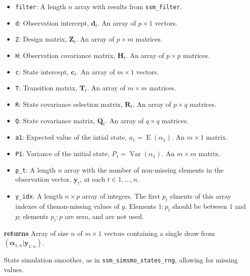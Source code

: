 \documentclass[]{book}
\providecommand{\tightlist}{%
  \setlength{\itemsep}{0pt}\setlength{\parskip}{0pt}}
\DeclareMathOperator{\E}{E}
\DeclareMathOperator{\Var}{Var}
\newcommand{\mat}[1]{\boldsymbol{#1}}
\renewcommand{\vec}[1]{\boldsymbol{#1}}
\begin{document}
\begin{itemize}
\tightlist
\item
  \texttt{filter}: A length \(n\) array with results from
  \texttt{ssm\_filter}.
\item
  \texttt{d}: Observation intercept, \(\vec{d}_t\). An array of
  \(p \times 1\) vectors.
\item
  \texttt{Z}: Design matrix, \(\mat{Z}_t\). An array of \(p \times m\)
  matrices.
\item
  \texttt{H}: Observation covariance matrix, \(\mat{H}_t\). An array of
  \(p \times p\) matrices.
\item
  \texttt{c}: State intercept, \(\vec{c}_t\). An array of \(m \times 1\)
  vectors.
\item
  \texttt{T}: Transition matrix, \(\mat{T}_t\). An array of
  \(m \times m\) matrices.
\item
  \texttt{R}: State covariance selection matrix, \(\mat{R} _t\). An
  array of \(p \times q\) matrices.
\item
  \texttt{Q}: State covariance matrix, \(\mat{Q}_t\). An array of
  \(q \times q\) matrices.
\item
  \texttt{a1}: Expected value of the intial state,
  \(a_1 = \E(\alpha_1)\). An \(m \times 1\) matrix.
\item
  \texttt{P1}: Variance of the initial state, \(P_1 = \Var(\alpha_1)\).
  An \(m \times m\) matrix.
\item
  \texttt{p\_t}: A length \(n\) array with the number of non-missing
  elements in the observation vector, \(\vec{y}_t\), at each
  \(t \in 1, \dots, n\).
\item
  \texttt{y\_idx}: A length \(n \times p\) array of integers. The first
  \(p_t\) elments of this array indexes of thenon-missing values of
  \(y\). Elements \(1:p_t\) should be between \(1\) and \(p\); elements
  \(p_t:p\) are zero, and are not used.
\end{itemize}

\textbf{returns} Array of size \(n\) of \(m \times 1\) vectors
containing a single draw from \((\vec{\alpha}_{1:n} | \vec{y}_{1:n})\).

State simulation smoother, as in \texttt{ssm\_simsmo\_states\_rng},
allowing for missing values.
\end{document}
